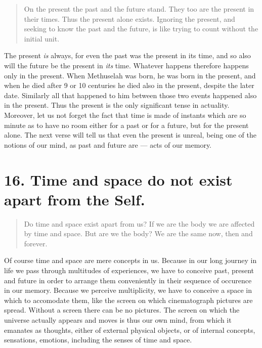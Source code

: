 \documentclass[12pt]{report}
\begin{document}
\begin{quote}
  On the present the past and the future stand. They too are the present
  in their times. Thus the present alone exists. Ignoring the present,
  and seeking to know the past and the future, is like trying to count
  without the initial unit.
\end{quote}

The present \emph{is} always, for even the past was the present in its
time, and so also will the future be the present in \emph{its}
time. Whatever happens therefore happens only in the present. When
Methuselah was born, he was born in the present, and when he died
after 9 or 10 centuries he died also in the present, despite the later
date. Similarly all that happened to him between those two events
happened also in the present. Thus the present is the only significant
tense in actuality. Moreover, let us not forget the fact that time is
made of instants which are so minute as to have no room either for a
past or for a future, but for the present alone. The next verse will
tell us that even the present is unreal, being one of the notions of
our mind, as past and future are --- acts of our memory.


\section{16. Time and space do not exist apart from the Self.}

\begin{quote}
  Do time and space exist apart from us? If we are the body we are
  affected by time and space. But are we the body? We are the same now,
  then and forever.
\end{quote}


Of course time and space are mere concepts in us. Because in our long
journey in life we pass through multitudes of experiences, we have to
conceive past, present and future in order to arrange them
conveniently in their sequence of occurence in our memory. Because we
perceive multiplicity, we have to conceive a space in which to
accomodate them, like the screen on which cinematograph pictures are
spread. Without a screen there can be no pictures. The screen on which
the universe actually appears and moves is thus our own mind, from
which it emanates as thoughts, either of external physical objects, or
of internal concepts, sensations, emotions, including the senses of
time and space. 
\end{document}
